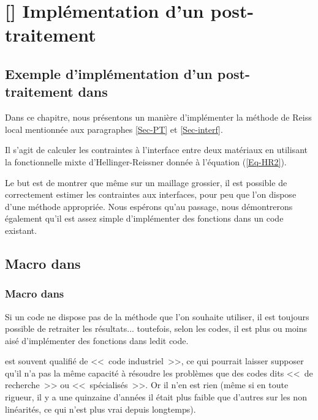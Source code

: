 \ifVersionAvecExemplesSepares
   \chapter{[\ansys] Implémentation d'un post-traitement}
\else
   \section{Exemple d'implémentation d'un post-traitement dans \ansys}
\fi

Dans ce chapitre, nous présentons un manière d'implémenter la méthode de Reiss local mentionnée aux
paragraphes \ref{Sec-PT} et \ref{Sec-interf}.

Il s'agit de calculer les contraintes à l'interface entre deux matériaux en utilisant la fonctionnelle mixte d'Hellinger-Reissner
donnée à l'équation (\ref{Eq-HR2}).

\medskip
Le but est de montrer que même sur un maillage grossier, il est possible de correctement estimer les contraintes
aux interfaces, pour peu que l'on dispose d'une méthode appropriée. Nous espérons qu'au passage, nous
démontrerons également qu'il est assez simple d'implémenter des fonctions dans un code existant.





\medskip
\ifVersionAvecExemplesSepares
   \section{Macro dans \ansys}
\else
   \subsection{Macro dans \ansys}
\fi

Si un code ne dispose pas de la méthode que l'on souhaite utiliser, il est toujours possible de retraiter les
résultats... toutefois, selon les codes, il est plus ou moins aisé d'implémenter des fonctions dans ledit code.

\medskip
\ansys est souvent qualifié de <<~code industriel~>>, ce qui pourrait laisser supposer qu'il n'a pas la même capacité
à résoudre les problèmes que des codes dits <<~de recherche~>> ou <<~spécialisés~>>.
Or il n'en est rien (même si en toute rigueur, il y a une quinzaine d'années il était plus faible que d'autres sur
les non linéarités, ce qui n'est plus vrai depuis longtemps).

